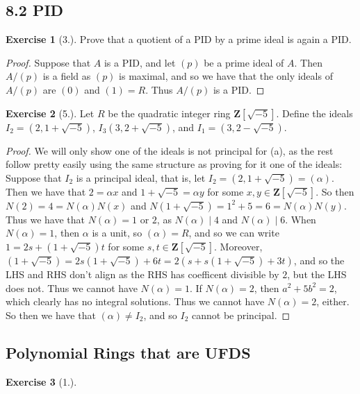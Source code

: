 \documentclass[9pt,reqno]{amsart}
\theoremstyle{definition}
\newtheorem{exercise}{Exercise}[section]
\newcommand{\zz}{\mathbf Z}
\begin{document}
\subsection{8.2 PID}
\begin{exercise}[3.] 
	Prove that a quotient of a PID by a prime ideal is again a PID.
\end{exercise}
\begin{proof}
	Suppose that $A$ is a PID, and let $(p)$ be a prime ideal of $A$. Then $A/(p)$ is a field as $(p)$ is maximal, and so we have that the only ideals of $A/(p)$ are $(0)$ and $(1) = R$. Thus $A/(p)$ is a PID. 
\end{proof}
\begin{exercise}[5.]
	Let $R$ be the quadratic integer ring $\zz[\sqrt{-5}]$. Define the ideals $I_2 = (2, 1+ \sqrt{-5})$, $I_3(3, 2+\sqrt{-5})$, and $I_1 = (3, 2-\sqrt{-5})$.
	\begin{proof}
		We will only show one of the ideals is not principal for (a), as the rest follow pretty easily using the same structure as proving for it one of the ideals: Suppose that $I_2$ is a principal ideal, that is, let $I_2 = (2, 1+ \sqrt{-5})= (\alpha) $. Then we have that $2 = \alpha x$ and $1+ \sqrt{-5} = \alpha y$ for some $x, y \in \zz[\sqrt{-5}]$. So then $N(2) = 4 = N(\alpha ) N(x)$ and $N(1+\sqrt{-5}) = 1^2 + 5 = 6 =   N(\alpha) N(y) $. Thus we have that $N (\alpha) = 1$ or $2$, as $N(\alpha) \mid 4$ and $N (\alpha) \mid 6$. When $N(\alpha) = 1$, then $\alpha$ is a unit, so $(\alpha) = R$, and so we can write $1 = 2s + (1+\sqrt{-5})t$ for some $s, t \in \zz[\sqrt{-5}]$. Moreover, $(1+\sqrt{-5}) = 2s(1+ \sqrt{-5}) + 6t = 2(s+s(1+\sqrt{-5}) + 3t)$, and so the LHS and RHS don't align as the RHS has coefficent divisible by $2$, but the LHS does not. Thus we cannot have $N(\alpha) = 1$. If $N(\alpha) = 2$, then $a^2 + 5 b^2 = 2$, which clearly has no integral solutions. Thus we cannot have $N(\alpha) = 2$, either. So then we have that $(\alpha) \neq I_2$, and so $I_2$ cannot be principal. 
			
	\end{proof}
\end{exercise}
\subsection{Polynomial Rings that are UFDS}
\begin{exercise}[1.] 
\end{exercise}
\end{document}
